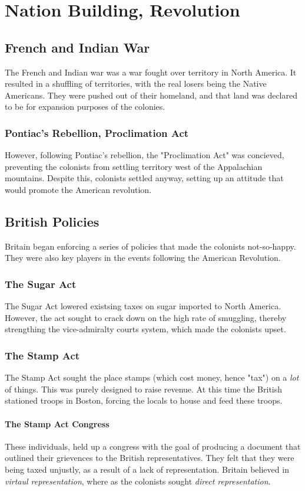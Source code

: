 \chapter{Nation Building, Revolution}
\section{French and Indian War}
The French and Indian war was a war fought over territory in North America.  It
resulted in a shuffling of territories, with the real losers being the Native
Americans.  They were pushed out of their homeland, and that land was declared
to be for expansion purposes of the colonies.

\subsection{Pontiac's Rebellion, Proclimation Act}
However, following Pontiac's rebellion, the "Proclimation Act" was concieved,
preventing the colonists from settling territory west of the Appalachian
mountains.  Despite this, colonists settled anyway, setting up an attitude that
would promote the American revolution.

\section{British Policies}
Britain began enforcing a series of policies that made the colonists
not-so-happy.  They were also key players in the events following the American
Revolution.

\subsection{The Sugar Act}
The Sugar Act lowered existsing taxes on sugar imported to North America.
However, the act sought to crack down on the high rate of smuggling, thereby
strengthing the vice-admiralty courts system, which made the colonists upset.

\subsection{The Stamp Act}
The Stamp Act sought the place stamps (which cost money, hence "tax") on a
\textit{lot} of things.  This was purely designed to raise revenue.  At this
time the British stationed troops in Boston, forcing the locals to house and
feed these troops.

\subsubsection{The Stamp Act Congress}
These individuals, held up a congress with the goal of producing a document that
outlined their grievences to the British representatives.  They felt that they
were being taxed unjustly, as a result of a lack of representation.  Britain
believed in \textit{virtaul representation}, where as the colonists sought
\textit{direct representation}.

